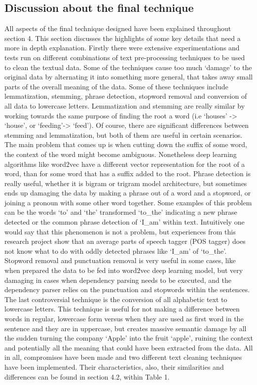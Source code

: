 \documentclass{sig-alternate}
\begin{document}
\subsection{Discussion about the final technique}
All aspects of the final technique designed have been explained throughout section 4. This section discusses the highlights of some key details that need a more in depth explanation.
Firstly there were extensive experimentations and tests run on different combinations of text pre-processing techniques to be used to clean the textual data. Some of the techniques cause too much `damage' to the original data by alternating it into something more general, that takes away small parts of the overall meaning of the data. Some of these techniques include lemmatization, stemming, phrase detection, stopword removal and conversion of all data to lowercase letters. Lemmatization and stemming are really similar by working towards the same purpose of finding the root a word (i.e `houses' -> `house', or `feeding'-> `feed'). Of course, there are significant differences between stemming and lemmatization, but both of them are useful in certain scenarios. The main problem that comes up is when cutting down the suffix of some word, the context of the word might become ambiguous. Nonetheless deep learning algorithms like word2vec have a different vector representation for the root of a word, than for some word that has a suffix added to the root. Phrase detection is really useful, whether it is bigram or trigram model architecture, but sometimes ends up damaging the data by making a phrase out of a word and a stopword, or joining a pronoun with some other word together. Some examples of this problem can be the words `to' and `the' transformed `to\_the' indicating a new phrase detected or the common phrase detection of `I\_am' within text. Intuitively one would say that this phenomenon is not a problem, but experiences from this research project show that an average parts of speech tagger (POS tagger) does not know what to do with oddly detected phrases like `I\_am' of `to\_the'. Stopword removal and punctuation removal is very useful in some cases, like when prepared the data to be fed into word2vec deep learning model, but very damaging in cases when dependency parsing needs to be executed, and the dependency parser relies on the punctuation and stopwords within the sentences. The last controversial technique is the conversion of all alphabetic text to lowercase letters. This technique is useful for not making a difference between words in regular, lowercase form versus when they are used as first word in the sentence and they are in uppercase, but creates massive semantic damage by all the sudden turning the company `Apple' into the fruit `apple', ruining the context and potentially all the meaning that could have been extracted from the data. All in all, compromises have been made and two different text cleaning techniques have been implemented. Their characteristics, also, their similarities and differences can be found in section 4.2, within Table 1.
\end{document}
